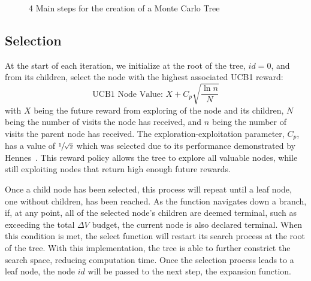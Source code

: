 \documentclass[letterpaper, paper,11pt]{AAS}	%
\newcommand*\circled[1]{\tikz[baseline=(char.base)]{
            \node[shape=circle,draw,inner sep=0.8pt] (char) {#1};}}
\begin{document}
\begin{figure}[htb]
    \centering
    \caption{4 Main steps for the creation of a Monte Carlo Tree}
    \label{fig:mctsFunc}
\end{figure}

\subsection{Selection}
At the start of each iteration, we initialize at the root of the tree, $id = 0$, and from its children, select the node with the highest associated UCB1 reward:
\begin{equation}
    \label{eq:UCB1}
    \text{UCB1 Node Value: } X + C_p \sqrt{\frac{\ln{n}}{N}}
\end{equation}
\clearpage \noindent with $X$ being the future reward from exploring of the node and its children, $N$ being the number of visits the node has received, and $n$ being the number of visits the parent node has received. The exploration-exploitation parameter, $C_p$, has a value of \(\sfrac{1}{\sqrt{2}}\) which was selected due to its performance demonstrated by Hennes~\cite{Hennes2015}. This reward policy allows the tree to explore all valuable nodes, while still exploiting nodes that return high enough future rewards.

Once a child node has been selected, this process will repeat until a leaf node, one without children, has been reached. As the function navigates down a branch, if, at any point, all of the selected node's children are deemed terminal, such as exceeding the total $\Delta V$ budget, the current node is also declared terminal. When this condition is met, the select function will restart its search process at the root of the tree. With this implementation, the tree is able to further constrict the search space, reducing computation time. Once the selection process leads to a leaf node, the node $id$ will be passed to the next step, the expansion function.
\end{document}
